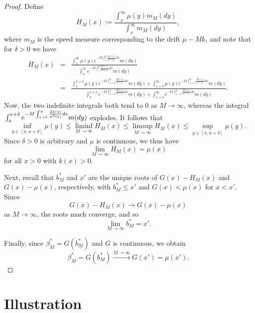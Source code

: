 \documentclass[12pt]{article}
\begin{document}
\begin{proof}
    Define
    \begin{equation*}
        H_M(x):=\frac{\int_x^\infty \mu(y)m_{M}(dy)}{\int_x^\infty m_{M}(dy)},
    \end{equation*}
    where $m_{M}$ is the speed measure corresponding to the drift $\mu-Mk$, and note that for $\delta>0$ we have
    \begin{eqnarray*}
        H_M(x) &=& \frac{\int_x^\infty \mu(y) e^{-M\int_c^y \frac{2k(z)}{\sigma^2(z)}dz} m(dy)}
        {\int_x^\infty e^{-M\int_c^y \frac{2k(z)}{\sigma^2(z)}dz}m(dy)}\\
        &=& \frac{\int_x^{x+\delta} \mu(y) e^{-M\int_{x+\delta}^y \frac{2k(z)}{\sigma^2(z)}dz} m(dy) + \int_{x+\delta}^\infty \mu(y) e^{-M\int_{x+\delta}^y \frac{2k(z)}{\sigma^2(z)}dz} m(dy)}
        {\int_x^{x+\delta} e^{-M\int_{x+\delta}^y \frac{2k(z)}{\sigma^2(z)}dz}m(dy) + \int_{x+\delta}^\infty e^{-M\int_{x+\delta}^y \frac{2k(z)}{\sigma^2(z)}dz}m(dy)}.
    \end{eqnarray*}
    Now, the two indefinite integrals both tend to 0 as $M\to\infty$, whereas the integral 
    $\\ \int_x^{x+\delta} e^{-M\int_{x+\delta}^y \frac{2k(z)}{\sigma^2(z)}dz}m(dy)$ explodes. It follows that
    \[\inf_{y\in[x,x+\delta]}\mu(y)\leq \liminf_{M\to\infty} H_M(x)\leq \limsup_{M\to\infty} H_M(x)\leq \sup_{y\in[x,x+\delta]}\mu(y).\]
    Since $\delta>0$ is arbitrary and $\mu$ is continuous, we thus have 
    \[\lim_{M\to\infty}H_M(x)=\mu(x)\]
    for all $x>0$ with $k(x)>0$.
        
    Next, recall that $b^*_M$ and $x'$ are the unique roots of $G(x)-H_M(x)$ and $G(x)-\mu(x)$, respectively, with $b^*_M\leq x'$ and 
    $G(x)<\mu(x)$ for $x<x'$. Since
    \[G(x)-H_M(x) \to G(x)-\mu(x)\] 
    as $M \to \infty$, the roots much converge, and so
    \begin{equation*}
        \lim_{M \to \infty }b_M^* = x'.
    \end{equation*}
    
    Finally, since $\beta_M^*=G(b_M^*)$ and $G$ is continuous, we obtain
    \begin{equation*}
        \beta_M^* = G(b_M^*) \xrightarrow{M\to \infty} G(x') = \mu(x').
    \end{equation*}
\end{proof}

\section{Illustration}\label{Sec:Numerical}
\end{document}
